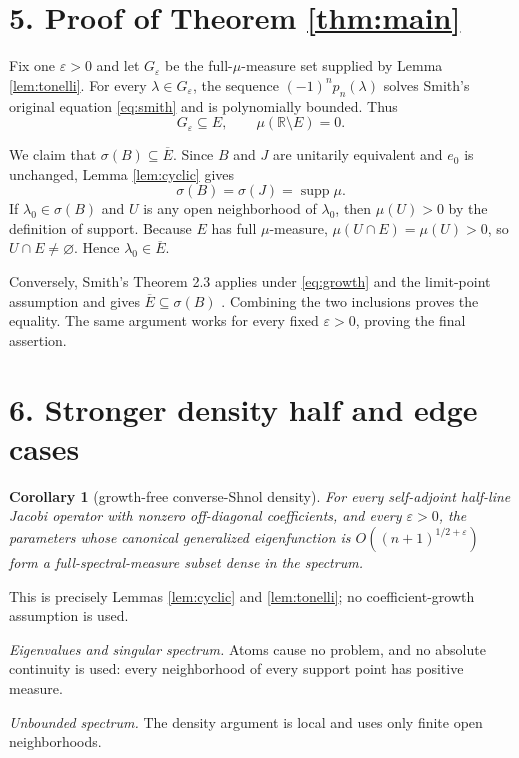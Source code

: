 \documentclass[11pt]{article}
\newtheorem{corollary}[theorem]{Corollary}
\newcommand{\R}{\mathbb R}
\newcommand{\supp}{\operatorname{supp}}
\begin{document}
\clearpage
\section*{5. Proof of Theorem \ref{thm:main}}

Fix one $\varepsilon>0$ and let $G_\varepsilon$ be the full-$\mu$-measure set supplied by Lemma \ref{lem:tonelli}.  For every $\lambda\in G_\varepsilon$, the sequence $(-1)^np_n(\lambda)$ solves Smith's original equation \eqref{eq:smith} and is polynomially bounded.  Thus
\[
 G_\varepsilon\subseteq E,
 \qquad \mu(\R\setminus E)=0.
\]

We claim that $\sigma(B)\subseteq\overline E$.  Since $B$ and $J$ are unitarily equivalent and $e_0$ is unchanged, Lemma \ref{lem:cyclic} gives
\[
 \sigma(B)=\sigma(J)=\supp\mu.
\]
If $\lambda_0\in\sigma(B)$ and $U$ is any open neighborhood of $\lambda_0$, then $\mu(U)>0$ by the definition of support.  Because $E$ has full $\mu$-measure, $\mu(U\cap E)=\mu(U)>0$, so $U\cap E\ne\varnothing$.  Hence $\lambda_0\in\overline E$.

Conversely, Smith's Theorem 2.3 applies under \eqref{eq:growth} and the limit-point assumption and gives $\overline E\subseteq\sigma(B)$ \cite{Smith}.  Combining the two inclusions proves the equality.  The same argument works for every fixed $\varepsilon>0$, proving the final assertion.

\section*{6. Stronger density half and edge cases}

\begin{corollary}[growth-free converse-Shnol density]\label{cor:stronger}
For every self-adjoint half-line Jacobi operator with nonzero off-diagonal coefficients, and every $\varepsilon>0$, the parameters whose canonical generalized eigenfunction is $O((n+1)^{1/2+\varepsilon})$ form a full-spectral-measure subset dense in the spectrum.
\end{corollary}

This is precisely Lemmas \ref{lem:cyclic} and \ref{lem:tonelli}; no coefficient-growth assumption is used.

\emph{Eigenvalues and singular spectrum.}  Atoms cause no problem, and no absolute continuity is used: every neighborhood of every support point has positive measure.

\emph{Unbounded spectrum.}  The density argument is local and uses only finite open neighborhoods.
\end{document}
